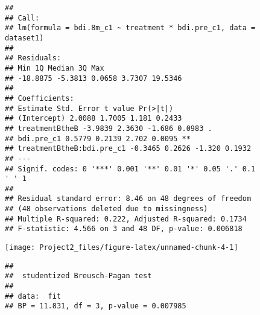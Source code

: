 \documentclass[
]{article}
\newenvironment{Shaded}{\begin{snugshade}}{\end{snugshade}}
\newcommand{\CommentTok}[1]{\textcolor[rgb]{0.56,0.35,0.01}{\textit{#1}}}
\newcommand{\DataTypeTok}[1]{\textcolor[rgb]{0.13,0.29,0.53}{#1}}
\newcommand{\DecValTok}[1]{\textcolor[rgb]{0.00,0.00,0.81}{#1}}
\newcommand{\FloatTok}[1]{\textcolor[rgb]{0.00,0.00,0.81}{#1}}
\newcommand{\KeywordTok}[1]{\textcolor[rgb]{0.13,0.29,0.53}{\textbf{#1}}}
\newcommand{\NormalTok}[1]{#1}
\newcommand{\OperatorTok}[1]{\textcolor[rgb]{0.81,0.36,0.00}{\textbf{#1}}}
\newcommand{\StringTok}[1]{\textcolor[rgb]{0.31,0.60,0.02}{#1}}
\begin{document}
\begin{verbatim}
##
## Call:
## lm(formula = bdi.8m_c1 ~ treatment * bdi.pre_c1, data =
dataset1)
##
## Residuals:
## Min 1Q Median 3Q Max
## -18.8875 -5.3813 0.0658 3.7307 19.5346
##
## Coefficients:
## Estimate Std. Error t value Pr(>|t|)
## (Intercept) 2.0088 1.7005 1.181 0.2433
## treatmentBtheB -3.9839 2.3630 -1.686 0.0983 .
## bdi.pre_c1 0.5779 0.2139 2.702 0.0095 **
## treatmentBtheB:bdi.pre_c1 -0.3465 0.2626 -1.320 0.1932
## ---
## Signif. codes: 0 '***' 0.001 '**' 0.01 '*' 0.05 '.' 0.1
' ' 1
##
## Residual standard error: 8.46 on 48 degrees of freedom
## (48 observations deleted due to missingness)
## Multiple R-squared: 0.222, Adjusted R-squared: 0.1734
## F-statistic: 4.566 on 3 and 48 DF, p-value: 0.006818
\end{verbatim}

\begin{Shaded}
\end{Shaded}

\begin{center}\texttt{[image: Project2\_files/figure-latex/unnamed-chunk-4-1]} \end{center}

\begin{Shaded}
\end{Shaded}

\begin{verbatim}
## 
##  studentized Breusch-Pagan test
## 
## data:  fit
## BP = 11.831, df = 3, p-value = 0.007985
\end{verbatim}

\begin{Shaded}
\end{Shaded}
\end{document}
